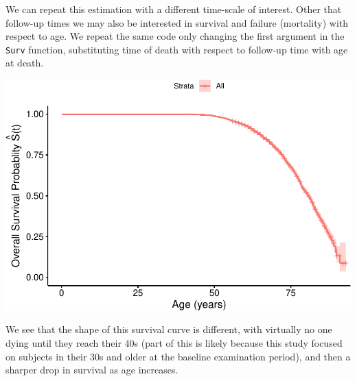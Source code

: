 \documentclass[
]{book}
\newenvironment{Shaded}{\begin{snugshade}}{\end{snugshade}}
\newcommand{\DataTypeTok}[1]{\textcolor[rgb]{0.13,0.29,0.53}{#1}}
\newcommand{\DecValTok}[1]{\textcolor[rgb]{0.00,0.00,0.81}{#1}}
\newcommand{\KeywordTok}[1]{\textcolor[rgb]{0.13,0.29,0.53}{\textbf{#1}}}
\newcommand{\NormalTok}[1]{#1}
\newcommand{\OperatorTok}[1]{\textcolor[rgb]{0.81,0.36,0.00}{\textbf{#1}}}
\newcommand{\StringTok}[1]{\textcolor[rgb]{0.31,0.60,0.02}{#1}}
\begin{document}
We can repeat this estimation with a different time-scale of interest. Other that follow-up times we may also be interested in survival and failure (mortality) with respect to age. We repeat the same code only changing the first argument in the \texttt{Surv} function, substituting time of death with respect to follow-up time with age at death.

\begin{Shaded}
\end{Shaded}

\includegraphics{adv_epi_analysis_files/figure-latex/unnamed-chunk-202-1.pdf}

We see that the shape of this survival curve is different, with virtually no one dying until they reach their 40s (part of this is likely because this study focused on subjects in their 30s and older at the baseline examination period), and then a sharper drop in survival as age increases.
\end{document}

